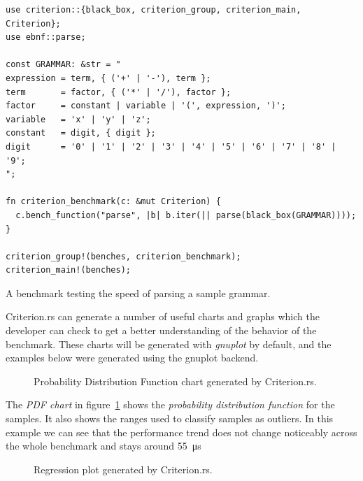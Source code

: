 \documentclass[english,engineering]{wizthesis}
\begin{document}
\begin{listing}[H]
  \begin{verbatim}
use criterion::{black_box, criterion_group, criterion_main, Criterion};
use ebnf::parse;

const GRAMMAR: &str = "
expression = term, { ('+' | '-'), term };
term       = factor, { ('*' | '/'), factor };
factor     = constant | variable | '(', expression, ')';
variable   = 'x' | 'y' | 'z';
constant   = digit, { digit };
digit      = '0' | '1' | '2' | '3' | '4' | '5' | '6' | '7' | '8' | '9';
";

fn criterion_benchmark(c: &mut Criterion) {
  c.bench_function("parse", |b| b.iter(|| parse(black_box(GRAMMAR))));
}

criterion_group!(benches, criterion_benchmark);
criterion_main!(benches);
  \end{verbatim}
  \caption{A benchmark testing the speed of parsing a sample grammar.}
  \label{lst:benchmark}
\end{listing}

Criterion.rs can generate a number of useful charts and graphs which the
developer can check to get a better understanding of the behavior of the
benchmark. These charts will be generated with \emph{gnuplot} by default, and
the examples below were generated using the gnuplot backend.

\begin{figure}[H]
  \centering
  \resizebox{\textwidth}{!}{\footnotesize}
  \caption{Probability Distribution Function chart generated by Criterion.rs.}
  \label{fig:pdf-benchmark}
\end{figure}

The \emph{PDF chart} in figure~\ref{fig:pdf-benchmark} shows the
\emph{probability distribution function} for the samples. It also shows the
ranges used to classify samples as outliers. In this example we can see that the
performance trend does not change noticeably across the whole benchmark and
stays around \SI{55}{\micro\second}

\begin{figure}[H]
  \centering
  \resizebox{\textwidth}{!}{\footnotesize}
  \caption{Regression plot generated by Criterion.rs.}
  \label{fig:regression-benchmark}
\end{figure}
\end{document}
